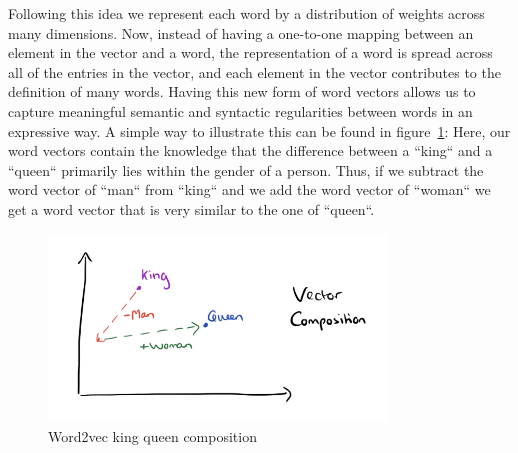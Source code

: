Following this idea we represent each word by a distribution of weights across many dimensions. Now, instead of having a one-to-one mapping between an element in the vector and a word, the representation of a word is spread across all of the entries in the vector, and each element in the vector contributes to the definition of many words. Having this new form of word vectors allows us to capture meaningful semantic and syntactic regularities between words in an expressive way. A simple way to illustrate this can be found in figure~\ref{fig:word2vec_king_queen_composition}: Here, our word vectors contain the knowledge that the difference between a “king“ and a “queen“ primarily lies within the gender of a person. Thus, if we subtract the word vector of “man“ from “king“ and we add the word vector of “woman“ we get a word vector that is very similar to the one of “queen“. 

\begin{figure}[h]
  \includegraphics[height=5cm]{img/word2vec-king-queen-composition}
  \caption{Word2vec king queen composition}
\label{fig:word2vec_king_queen_composition}
\end{figure}

